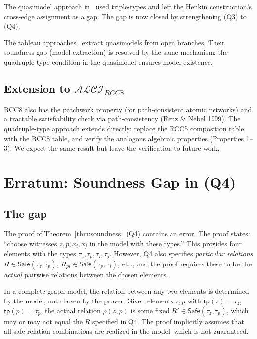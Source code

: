 \documentclass[a4paper,11pt]{article}
\theoremstyle{definition}
\newcommand{\ALCIRCC}[1]{\ensuremath{\mathcal{ALCI}_{\mathit{RCC#1}}}}
\newcommand{\tp}{\ensuremath{\mathsf{tp}}}
\newcommand{\Safe}{\ensuremath{\mathsf{Safe}}}
\begin{document}
The quasimodel approach in~\cite{CompanionPaper} used triple-types
and left the Henkin construction's cross-edge assignment as a gap.
The gap is now closed by strengthening (Q3) to (Q4).

The tableau approaches~\cite{TableauPaper,TrianglePaper} extract
quasimodels from open branches.  Their soundness gap (model
extraction) is resolved by the same mechanism: the quadruple-type
condition in the quasimodel ensures model existence.

\subsection{Extension to $\ALCIRCC{8}$}

RCC8 also has the patchwork property (for path-consistent
atomic networks) and a tractable satisfiability check via
path-consistency (Renz \& Nebel 1999).  The quadruple-type
approach extends directly: replace the RCC5 composition table
with the RCC8 table, and verify the analogous algebraic
properties (Properties 1--3).  We expect the same result but
leave the verification to future work.


\section{Erratum: Soundness Gap in (Q4)}
\label{sec:erratum}

\subsection{The gap}

The proof of Theorem~\ref{thm:soundness}~(Q4) contains an error.
The proof states: ``choose witnesses $z, p, x_i, x_j$ in the
model with these types.''  This provides four elements with
the types $\tau_z, \tau_p, \tau_i, \tau_j$.  However, Q4 also
specifies \emph{particular relations} $R \in \Safe(\tau_z, \tau_p)$,
$R_{pi} \in \Safe(\tau_p, \tau_i)$, etc., and the proof requires
these to be the \emph{actual} pairwise relations between the
chosen elements.

In a complete-graph model, the relation between any two elements
is determined by the model, not chosen by the prover.  Given
elements $z, p$ with $\tp(z) = \tau_z$, $\tp(p) = \tau_p$,
the actual relation $\rho(z, p)$ is some fixed $R' \in \Safe(\tau_z, \tau_p)$,
which may or may not equal the $R$ specified in Q4.  The proof
implicitly assumes that all safe relation combinations are
realized in the model, which is not guaranteed.
\end{document}
